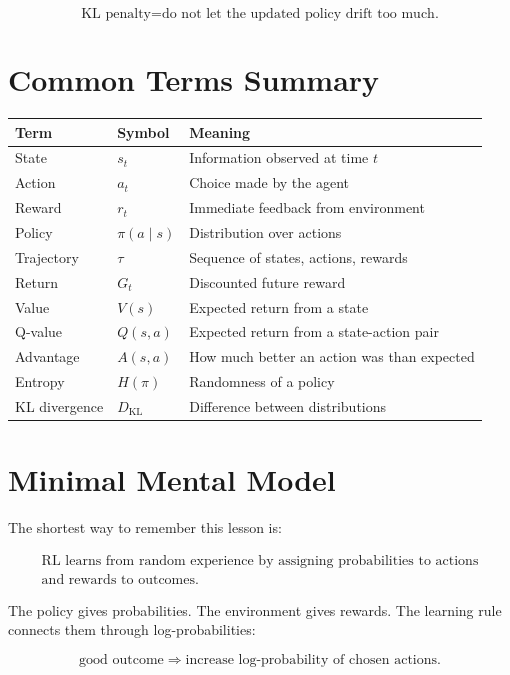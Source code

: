 \documentclass[11pt]{article}
\begin{document}
\[
\boxed{
\text{KL penalty} = \text{do not let the updated policy drift too much.}
}
\]

\section{Common Terms Summary}

\begin{center}
\begin{tabular}{lll}
\toprule
Term & Symbol & Meaning \\
\midrule
State & $s_t$ & Information observed at time $t$ \\
Action & $a_t$ & Choice made by the agent \\
Reward & $r_t$ & Immediate feedback from environment \\
Policy & $\pi(a \mid s)$ & Distribution over actions \\
Trajectory & $\tau$ & Sequence of states, actions, rewards \\
Return & $G_t$ & Discounted future reward \\
Value & $V(s)$ & Expected return from a state \\
Q-value & $Q(s,a)$ & Expected return from a state-action pair \\
Advantage & $A(s,a)$ & How much better an action was than expected \\
Entropy & $H(\pi)$ & Randomness of a policy \\
KL divergence & $D_{\mathrm{KL}}$ & Difference between distributions \\
\bottomrule
\end{tabular}
\end{center}

\section{Minimal Mental Model}

The shortest way to remember this lesson is:

\[
\boxed{
\begin{gathered}
\text{RL learns from random experience by assigning probabilities to actions} \\
\text{and rewards to outcomes.}
\end{gathered}
}
\]

The policy gives probabilities.
The environment gives rewards.
The learning rule connects them through log-probabilities:

\[
\boxed{
\text{good outcome} \Rightarrow \text{increase log-probability of chosen actions}.
}
\]
\end{document}
